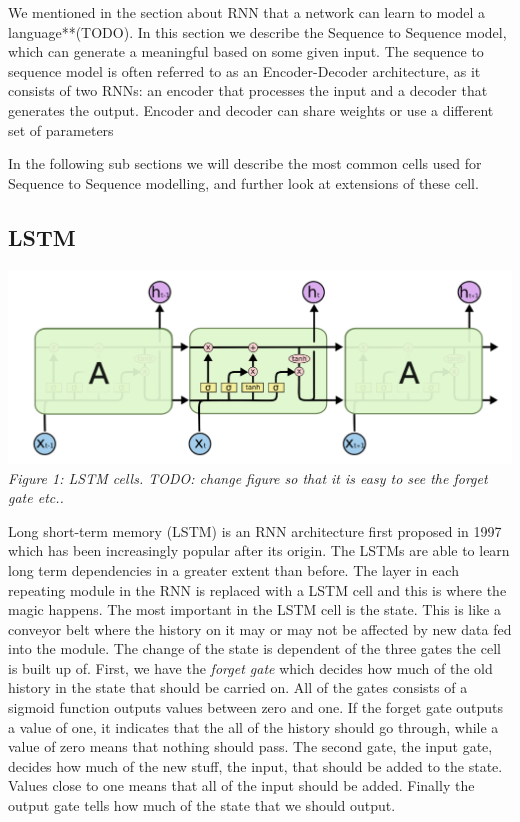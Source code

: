 \documentclass{article} %
\begin{document}
We mentioned in the section about RNN that a network can learn to model a language**(TODO). In this section we describe the Sequence to Sequence model, which can generate a meaningful based on some given input. The sequence to sequence model is often referred to as an Encoder-Decoder architecture, as it consists of two RNNs: an encoder that processes the input and a decoder that generates the output. Encoder and decoder can share weights or use a different set of parameters

In the following sub sections we will describe the most common cells used for Sequence to Sequence modelling, and further look at extensions of these cell. 

\subsection{LSTM}
\includegraphics[scale=0.5]{lstm_cells} \newline
\textit{Figure 1: LSTM cells. TODO: change figure so that it is easy to see the forget gate etc.. } \newline

Long short-term memory (LSTM) is an RNN architecture first proposed in 1997 \cite{LSTM} which has been increasingly popular after its origin. The LSTMs are able to learn long term dependencies in a greater extent than before. The layer in each repeating module in the RNN is replaced with a LSTM cell and this is where the magic happens. The most important in the LSTM cell is the state. This is like a conveyor belt where the history on it may or may not be affected by new data fed into the module. The change of the state is dependent of the three gates the cell is built up of. First, we have the \textit{forget gate} which decides how much of the old history in the state that should be carried on. All of the gates consists of a sigmoid function outputs values between zero and one. If the forget gate outputs a value of one, it indicates that the all of the history should go through, while a value of zero means that nothing should pass. The second gate, the input gate, decides how much of the new stuff, the input, that should be added to the state. Values close to one means that all of the input should be added. Finally the output gate tells how much of the state that we should output.
\end{document}
